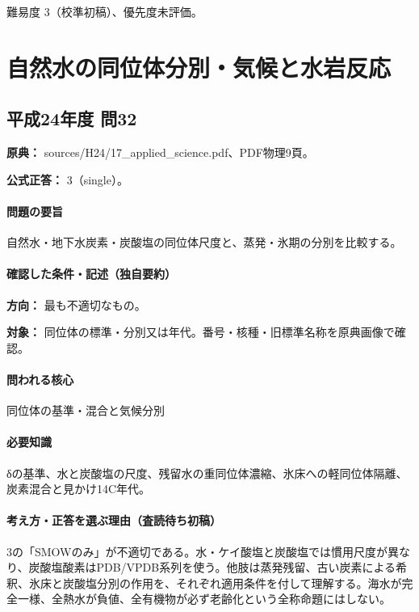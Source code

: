 \par 難易度 3（校準初稿）、優先度未評価。

\section{自然水の同位体分別・気候と水岩反応}

\subsection{平成24年度 問32}
\label{q:h24-reg-applied-32}

\noindent\textbf{原典：} sources/H24/17\_applied\_science.pdf、PDF物理9頁。

\textbf{公式正答：} 3（single）。

\paragraph{問題の要旨} 自然水・地下水炭素・炭酸塩の同位体尺度と、蒸発・氷期の分別を比較する。

\paragraph{確認した条件・記述（独自要約）}\mbox{}\par

\noindent\textbf{方向：} 最も不適切なもの。\par

\noindent\textbf{対象：} 同位体の標準・分別又は年代。番号・核種・旧標準名称を原典画像で確認。\par

\paragraph{問われる核心} 同位体の基準・混合と気候分別

\paragraph{必要知識} δの基準、水と炭酸塩の尺度、残留水の重同位体濃縮、氷床への軽同位体隔離、炭素混合と見かけ14C年代。

\paragraph{考え方・正答を選ぶ理由（査読待ち初稿）} 3の「SMOWのみ」が不適切である。水・ケイ酸塩と炭酸塩では慣用尺度が異なり、炭酸塩酸素はPDB/VPDB系列を使う。他肢は蒸発残留、古い炭素による希釈、氷床と炭酸塩分別の作用を、それぞれ適用条件を付して理解する。海水が完全一様、全熱水が負値、全有機物が必ず老齢化という全称命題にはしない。


